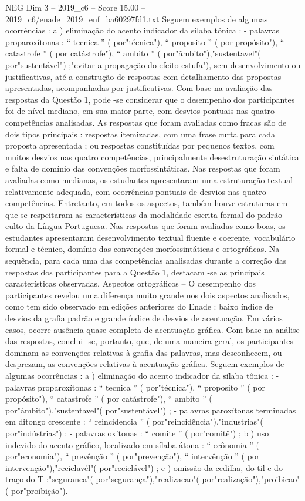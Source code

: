 \begin{textsample}{NEG Dim 3 – 2019\_c6 – Score 15.00 – 2019\_c6/enade\_2019\_enf\_ba60297fd1.txt}
Seguem exemplos de algumas ocorrências : a ) eliminação do acento indicador da sílaba tônica : - palavras proparoxítonas : “ tecnica ” ( por"técnica"), “ proposito ” ( por propósito"), “ catastrofe ” ( por catástrofe"), “ ambito ” ( por"âmbito"),"sustentavel"( por"sustentável") ;"evitar a propagação do efeito estufa"), sem desenvolvimento ou justificativas, até a construção de respostas com detalhamento das propostas apresentadas, acompanhadas por justificativas.
Com base na avaliação das respostas da Questão 1, pode -se considerar que o desempenho dos participantes foi de nível mediano, em sua maior parte, com desvios pontuais nas quatro competências analisadas.
As respostas que foram avaliadas como fracas são de dois tipos principais : respostas itemizadas, com uma frase curta para cada proposta apresentada ; ou respostas constituídas por pequenos textos, com muitos desvios nas quatro competências, principalmente desestruturação sintática e falta de domínio das convenções morfossintáticas.
Nas respostas que foram avaliadas como medianas, os estudantes apresentaram uma estruturação textual relativamente adequada, com ocorrências pontuais de desvios nas quatro competências.
Entretanto, em todos os aspectos, também houve estruturas em que se respeitaram as características da modalidade escrita formal do padrão culto da Língua Portuguesa.
Nas respostas que foram avaliadas como boas, os estudantes apresentaram desenvolvimento textual fluente e coerente, vocabulário formal e técnico, domínio das convenções morfossintáticas e ortográficas.
Na sequência, para cada uma das competências analisadas durante a correção das respostas dos participantes para a Questão 1, destacam -se as principais características observadas.
Aspectos ortográficos – O desempenho dos participantes revelou uma diferença muito grande nos dois aspectos analisados, como tem sido observado em edições anteriores do Enade : baixo índice de desvios da grafia padrão e grande índice de desvios de acentuação.
Em vários casos, ocorre ausência quase completa de acentuação gráfica.
Com base na análise das respostas, conclui -se, portanto, que, de uma maneira geral, os participantes dominam as convenções relativas à grafia das palavras, mas desconhecem, ou desprezam, as convenções relativas à acentuação gráfica.
Seguem exemplos de algumas ocorrências : a ) eliminação do acento indicador da sílaba tônica : - palavras proparoxítonas : “ tecnica ” ( por"técnica"), “ proposito ” ( por propósito"), “ catastrofe ” ( por catástrofe"), “ ambito ” ( por"âmbito"),"sustentavel"( por"sustentável") ; - palavras paroxítonas terminadas em ditongo crescente : “ reincidencia ” ( por"reincidência"),"industrias"( por"indústrias") ; - palavras oxítonas : “ comite ” ( por"comitê") ; b ) uso indevido do acento gráfico, localizado em sílaba átona : “ ecônomia ” ( por"economia"), “ prevênção ” ( por"prevenção"), “ intervênção ” ( por intervenção"),"reciclavél"( por"reciclável") ; c ) omissão da cedilha, do til e do traço do T :"seguranca"( por"segurança"),"realizacao"( por"realização"),"proibicao"( por"proibição").

\end{textsample}
